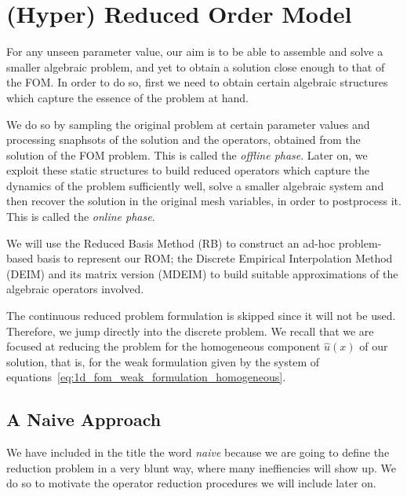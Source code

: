 \documentclass[../../thesis.tex]{subfiles}
\begin{document}
\section{(Hyper) Reduced Order Model}
\label{sec:rom_definition}
For any unseen parameter value, our aim is to be able to assemble and solve a smaller algebraic problem, 
and yet to obtain a solution close enough to that of the FOM.
In order to do so, first we need to obtain certain algebraic structures which capture the essence of the problem at hand.

We do so by sampling the original problem at certain parameter values and processing snaphsots of the solution and the operators, obtained from the solution of the FOM problem.
This is called the \emph{offline phase}.
Later on, we exploit these static structures to build reduced operators which capture the dynamics of the problem sufficiently well, solve a smaller algebraic system and then recover the solution in the original mesh variables, in order to postprocess it.
This is called the \emph{online phase}.


We will use the Reduced Basis Method (RB) to construct an ad-hoc problem-based basis to represent our ROM;
the Discrete Empirical Interpolation Method (DEIM) and its matrix version (MDEIM) 
to build suitable approximations of the algebraic operators involved. 

The continuous reduced problem formulation is skipped since it will not be used. 
Therefore, we jump directly into the discrete problem.
We recall that we are focused at reducing the problem for 
the homogeneous component $\hat{u}(x)$ of our solution, 
that is, for the weak formulation given by the system of equations~\eqref{eq:1d_fom_weak_formulation_homogeneous}.  

\subsection{A Naive Approach}
We have included in the title the word \emph{naive} because we are going to define the reduction problem in a very blunt way,
where many ineffiencies will show up.
We do so to motivate the operator reduction procedures we will include later on.
\end{document}
